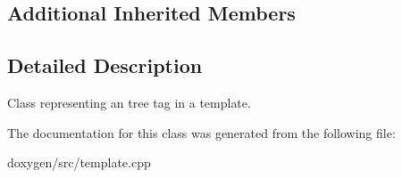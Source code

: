 \subsection*{Additional Inherited Members}


\subsection{Detailed Description}
Class representing an \textquotesingle{}tree\textquotesingle{} tag in a template. 

The documentation for this class was generated from the following file\+:\begin{DoxyCompactItemize}
\item 
doxygen/src/template.\+cpp\end{DoxyCompactItemize}
